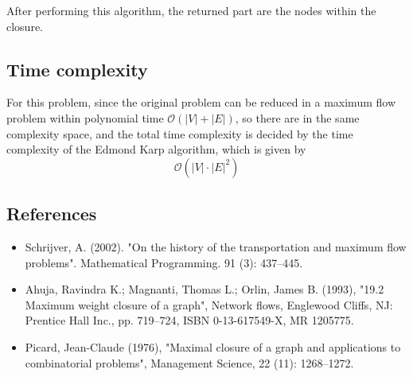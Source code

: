 \documentclass{article}
\begin{document}
After performing this algorithm, the returned part are the nodes within the closure.
\newpage
\subsection*{Time complexity}
For this problem, since the original problem can be reduced in a maximum flow problem within polynomial time $\mathcal{O}(|V|+|E|)$, so there are in the same complexity space, and the total time complexity is decided by the time complexity of the Edmond Karp algorithm, which is given by 
\[
	\mathcal{O}(|V|\cdot |E|^2)
\]
\subsection*{References}

\begin{itemize}\itemsep .125cm
	\item Schrijver, A. (2002). "On the history of the transportation and maximum flow problems". Mathematical Programming. 91 (3): 437–445. 
	\item Ahuja, Ravindra K.; Magnanti, Thomas L.; Orlin, James B. (1993), "19.2 Maximum weight closure of a graph", Network flows, Englewood Cliffs, NJ: Prentice Hall Inc., pp. 719–724, ISBN 0-13-617549-X, MR 1205775.
	\item Picard, Jean-Claude (1976), "Maximal closure of a graph and applications to combinatorial problems", Management Science, 22 (11): 1268–1272.
\end{itemize}

\ifx\onefile\undefined
	
\end{document}
